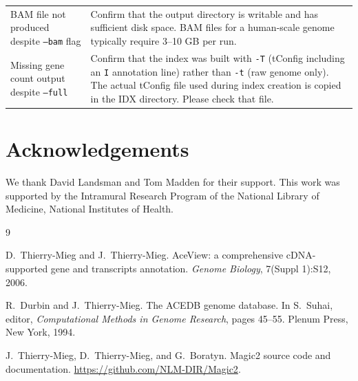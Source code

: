 \documentclass[11pt]{article}
\newcommand{\code}[1]{\texttt{#1}}
\begin{document}
\begin{center}
\begin{longtable}{p{5.5cm} p{9cm}}
BAM file not produced despite \code{--bam} flag
  & Confirm that the output directory is writable and has sufficient
    disk space.  BAM files for a human-scale genome typically require
    3--10 GB per run. \\[4pt]

Missing gene count output despite \code{--full}
  & Confirm that the index was built with \code{-T} (tConfig including
    an \code{I} annotation line) rather than \code{-t} (raw genome only).
    The actual tConfig file used during index creation is copied in the
    IDX directory. Please check that file.\\

\bottomrule
\end{longtable}
\end{center}

\section*{Acknowledgements}

We thank David Landsman and Tom Madden for their support.
This work was supported by the Intramural Research Program of the
National Library of Medicine, National Institutes of Health.

\begin{thebibliography}{9}

D.~Thierry-Mieg and J.~Thierry-Mieg.
AceView: a comprehensive cDNA-supported gene and transcripts annotation.
\emph{Genome Biology}, 7(Suppl 1):S12, 2006.

R.~Durbin and J.~Thierry-Mieg.
The ACEDB genome database.
In S.~Suhai, editor, \emph{Computational Methods in Genome Research},
pages 45--55. Plenum Press, New York, 1994.

J.~Thierry-Mieg, D.~Thierry-Mieg, and G.~Boratyn.
Magic2 source code and documentation.
\url{https://github.com/NLM-DIR/Magic2}.

\end{thebibliography}
\end{document}
